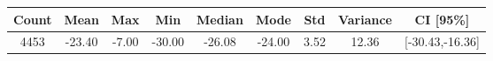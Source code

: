 \begin{tabular}{|c|c|c|c|c|c|c|c|c|}\hline
\rowcolor{Plum!20}
Count&Mean&Max&Min&Median&Mode&Std&Variance&CI [95\%]\\\hline\hline
4453&-23.40&-7.00&-30.00&-26.08&-24.00&3.52&12.36&[-30.43,-16.36]\\\hline
\end{tabular}
